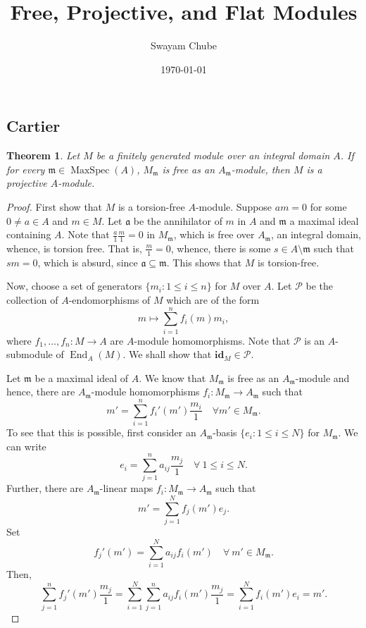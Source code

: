 \documentclass[12pt]{article}
\title{Free, Projective, and Flat Modules}
\author{Swayam Chube}
\date{\today}
\theoremstyle{thmstyle}
\newtheorem{theorem}{Theorem}[section]
\theoremstyle{defstyle}
\newcommand{\id}{\mathbf{id}}
\newcommand{\End}{\operatorname{End}}
\newcommand{\fraka}{\mathfrak{a}} %
\newcommand{\frakm}{\mathfrak{m}} %
\newcommand{\scrP}{\mathscr P}
\renewcommand{\le}{\leqslant}
\newcommand{\MaxSpec}{\operatorname{MaxSpec}}
\begin{document}
\maketitle

\subsection{Cartier}

\begin{theorem}
    Let $M$ be a finitely generated module over an integral domain $A$. If for every $\frakm\in\MaxSpec(A)$, $M_\frakm$ is free as an $A_\frakm$-module, then $M$ is a projective $A$-module.
\end{theorem}
\begin{proof}
    First show that $M$ is a torsion-free $A$-module. Suppose $am = 0$ for some $0\ne a\in A$ and $m\in M$. Let $\fraka$ be the annihilator of $m$ in $A$ and $\frakm$ a maximal ideal containing $A$. Note that $\frac{a}{1}\frac{m}{1} = 0$ in $M_\frakm$, which is free over $A_\frakm$, an integral domain, whence, is torsion free. That is, $\frac{m}{1} = 0$, whence, there is some $s\in A\setminus\frakm$ such that $sm = 0$, which is absurd, since $\fraka\subseteq\frakm$. This shows that $M$ is torsion-free.

    Now, choose a set of generators $\{m_i\colon 1\le i\le n\}$ for $M$ over $A$. Let $\scrP$ be the collection of $A$-endomorphisms of $M$ which are of the form 
    \begin{equation*}
        m\longmapsto\sum_{i = 1}^n f_i(m)m_i,
    \end{equation*}
    where $f_1,\dots, f_n: M\to A$ are $A$-module homomorphisms. Note that $\scrP$ is an $A$-submodule of $\End_A(M)$. We shall show that $\id_M\in\scrP$.

    Let $\frakm$ be a maximal ideal of $A$. We know that $M_\frakm$ is free as an $A_\frakm$-module and hence, there are $A_\frakm$-module homomorphisms $f_i: M_\frakm\to A_\frakm$ such that 
    \begin{equation*}
        m' = \sum_{i = 1}^n f_i'(m')\frac{m_i}{1}\quad\forall m'\in M_\frakm.
    \end{equation*}
    To see that this is possible, first consider an $A_\frakm$-basis $\{e_i\colon 1\le i\le N\}$ for $M_\frakm$. We can write 
    \begin{equation*}
        e_i = \sum_{j = 1}^n a_{ij}\frac{m_j}{1}\quad\forall~1\le i\le N.
    \end{equation*}
    Further, there are $A_\frakm$-linear maps $f_i: M_\frakm\to A_\frakm$ such that 
    \begin{equation*}
        m' = \sum_{j = 1}^N f_j(m')e_j.
    \end{equation*}
    Set 
    \begin{equation*}
        f_j'(m') = \sum_{i = 1}^N a_{ij}f_i(m')\quad\forall~m'\in M_\frakm.
    \end{equation*}
    Then, 
    \begin{equation*}
        \sum_{j = 1}^nf_j'(m')\frac{m_j}{1} = \sum_{i = 1}^N\sum_{j = 1}^n a_{ij}f_i(m')\frac{m_j}{1} = \sum_{i = 1}^N f_i(m')e_i = m'.
    \end{equation*}


\end{proof}
\end{document}
